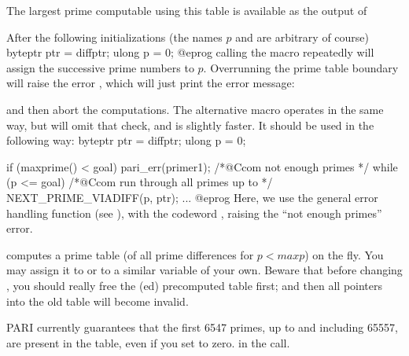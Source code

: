 The largest prime computable using this table is available as the output of


After the following initializations (the names $p$ and  are arbitrary of
course)
\bprog
byteptr ptr = diffptr;
ulong p = 0;
@eprog
\noindent calling the macro  repeatedly will
assign the successive prime numbers to $p$. Overrunning the prime table boundary
will raise the error , which will just print the error message:


\noindent and then abort the computations. The alternative macro
 operates in the same way, but will omit that check, and
is slightly faster. It should be used in the following way:
%
\bprog
byteptr ptr = diffptr;
ulong p = 0;

if (maxprime() < goal) pari_err(primer1); /*@Ccom not enough primes */
while (p <= goal) /*@Ccom run through all primes up to  */
{
  NEXT_PRIME_VIADIFF(p, ptr);
  ...
}
@eprog\noindent
Here, we use the general error handling function  (see
), with the codeword , raising the ``not enough
primes'' error.

 computes a prime table (of all prime
differences for $p < maxp$) on the fly. You may assign it to  or
to a similar variable of your own. Beware that before changing ,
you should really free the (ed) precomputed table first; and then
all pointers into the old table will become invalid.

PARI currently guarantees that the first 6547 primes, up to and including
65557, are present in the table, even if you set  to zero.
in the  call.
\vfill\eject
